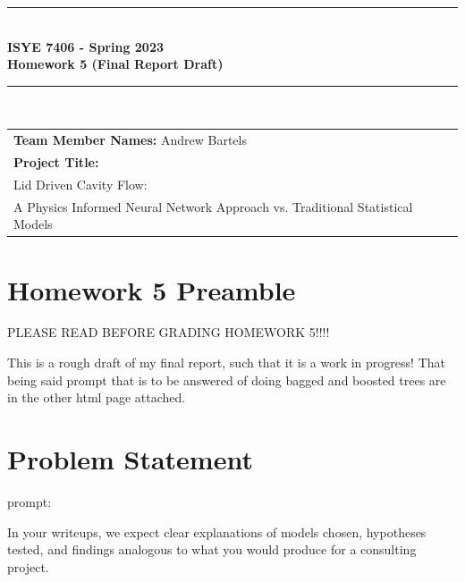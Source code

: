 \documentclass{article}
\begin{document}
\begin{titlepage}
	\clearpage\thispagestyle{empty}
	\centering
	\vspace{1cm}

	\rule{\linewidth}{1mm} \\[0.5cm]
	{ \Large \bfseries ISYE 7406 - Spring 2023\\[0.2cm]
	Homework 5 (Final Report Draft)}\\[0.5cm]
	\rule{\linewidth}{1mm} \\[1cm]

	\begin{tabular}{l p{5cm}}
		\textbf{Team Member Names:} Andrew Bartels & \\[10pt]
		\textbf{Project Title:}                      \\ Lid Driven
		Cavity Flow:                                 \\
		A Physics Informed Neural Network Approach vs.
		Traditional Statistical Models             & \\[10pt]

	\end{tabular}
\end{titlepage}

\tableofcontents
\clearpage
\thispagestyle{empty}
\listoffigures
\newpage
{}

\section{Homework 5 Preamble}

 {\LARGE PLEASE READ BEFORE GRADING HOMEWORK 5!!!!}

This is a rough draft of my final report, such that it is a work in
progress! That being said prompt that is to be answered of doing bagged and
boosted trees are in the other html page attached.

\section{Problem Statement}

prompt:

In your writeups, we expect clear explanations of models chosen,
hypotheses tested, and findings
analogous to what you would produce for a consulting project. \\
\end{document}
